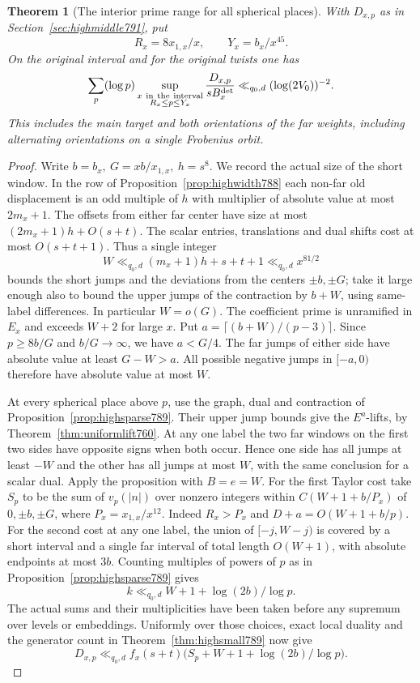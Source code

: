 \documentclass[a4paper,11pt]{article}
\newtheorem{theorem}[proposition]{Theorem}
\theoremstyle{definition}
\theoremstyle{remark}
\numberwithin{equation}{section}
\begin{document}
\begin{theorem}[The interior prime range for all spherical places]
\leavevmode\label{thm:interior795}
With \(D_{x,p}\) as in Section~\ref{sec:highmiddle791}, put
\[
      R_x=8x_{1,x}/x,\qquad Y_x=b_x/x^{45}.
\]
On the original interval and for the original twists one has
\[
   \sum_p(\log p)\sup_{\substack{x\ {\rm in\ the\ interval}\\
                                R_x\le p\le Y_x}}
       \frac{D_{x,p}}{sB_x^{\rm det}}
                   \ll_{q_0,d}(\log(2V_0))^{-2}.
\]
This includes the main target and both orientations of the
far weights, including alternating orientations on a single
Frobenius orbit.
\end{theorem}
\begin{proof}
Write \(b=b_x,\ G=xb/x_{1,x},\ h=s^8\).
We record the actual size of the short window. In the row
of Proposition~\ref{prop:highwidth788} each non-far old
displacement is an odd multiple of \(h\) with multiplier
of absolute value at most \(2m_x+1\). The offsets from
either far center have size at most
\((2m_x+1)h+O(s+t)\). The scalar entries, translations
and dual shifts cost at most \(O(s+t+1)\). Thus a single
integer
\[
        W\ll_{q_0,d} (m_x+1)h+s+t+1
                    \ll_{q_0,d} x^{81/2}
\]
bounds the short jumps and the deviations from the centers
\(\pm b,\pm G\); take it large enough also to bound the
upper jumps of the contraction by \(b+W\), using
same-label differences. In particular \(W=o(G)\).
The coefficient prime is unramified in \(E_x\) and exceeds
\(W+2\) for large \(x\). Put \(a=\lceil(b+W)/(p-3)\rceil\).
Since \(p\ge8b/G\) and \(b/G\to\infty\), we have \(a<G/4\).
The far jumps of either side have absolute value at least
\(G-W>a\). All possible negative jumps in \([-a,0)\)
therefore have absolute value at most \(W\).

At every spherical place above \(p\), use the graph, dual
and contraction of Proposition~\ref{prop:highsparse789}.
Their upper jump bounds give the \(E^a\)-lifts, by
Theorem~\ref{thm:uniformlift760}. At any one label the two
far windows on the first two sides have opposite signs
when both occur. Hence one side has all jumps at least
\(-W\) and the other has all jumps at most \(W\), with
the same conclusion for a scalar dual. Apply the proposition
with \(B=e=W\). For the first Taylor cost take \(S_p\) to be
the sum of \(v_p(|n|)\) over nonzero integers within
\(C(W+1+b/P_x)\) of \(0,\pm b,\pm G\), where
\(P_x=x_{1,x}/x^{12}\). Indeed \(R_x>P_x\) and
\(D+a=O(W+1+b/p)\). For the second cost at any one label,
the union of \([-j,W-j)\) is covered by a short interval
and a single far interval of total length \(O(W+1)\),
with absolute endpoints at most \(3b\). Counting multiples
of powers of \(p\) as in Proposition~\ref{prop:highsparse789}
gives
\[
        k\ll_{q_0,d} W+1+\log(2b)/\log p .
\]
The actual sums and their multiplicities have been taken
before any supremum over levels or embeddings. Uniformly
over those choices, exact local duality and the generator
count in Theorem~\ref{thm:highsmall789} now give
\[
 D_{x,p}\ll_{q_0,d} f_x(s+t)
                 \bigl(S_p+W+1+\log(2b)/\log p\bigr).
\]


\end{proof}
\end{document}
